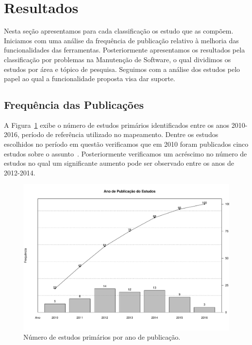 \section{Resultados}
\label{sec:mapeamento_resultados}

Nesta seção apresentamos para cada classificação os estudo que as compõem.
Iniciamos com uma análise da frequência de publicação relativo à melhoria das
funcionalidades das ferramentas. Posteriormente apresentamos os resultados pela
classificação por problemas na Manutenção de Software, o qual dividimos os
estudos por área e tópico de pesquisa. Seguimos com a análise dos estudos pelo
papel ao qual a funcionalidade proposta visa dar suporte.

\subsection{Frequência das Publicações}
\label{sub:frequencia_publicacao}

A Figura~\ref{fig:publicacao_por_ano} exibe o número de estudos primários
identificados entre os anos 2010\@-\@2016, período de referência utilizado no
mapeamento. Dentre os estudos escolhidos no período em questão verificamos que
em 2010 foram publicados cinco estudos sobre o
assunto~\cite{sun2010discriminative,gegick2010identifying,song2010jdf,nagwani2010predictive,zimmermann2010makes}.
Posteriormente verificamos um acréscimo no número de estudos no qual um
significante aumento pode ser observado entre os anos de 2012\@-\@2014.

\begin{figure}[htpb] \centering
	\includegraphics[width=0.9\linewidth]{chapter-mapeamento-sistematico/img/ano-publicao-estudos.pdf}
	\caption{Número de estudos primários por ano de publicação.}
\label{fig:publicacao_por_ano} \end{figure}

